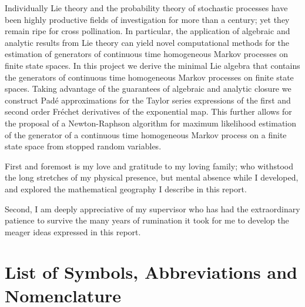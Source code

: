 \documentclass[12pt]{ucalgthes1}
\theoremstyle{definition}\newtheorem{definition}{Definition}
\begin{document}
	\newpage
	Individually Lie theory and the probability theory of stochastic processes have been
	highly productive fields of investigation for more than a century; yet they remain ripe
	for cross pollination. In particular, the application of algebraic and analytic results
	from Lie theory can yield novel computational methods for the estimation of generators of
	continuous time homogeneous Markov processes on finite state spaces. In this project we
	derive the minimal Lie algebra that contains the generators of continuous time homogeneous
	Markov processes on finite state spaces. Taking advantage of the guarantees of algebraic 
	and analytic closure we construct Pad\'{e} approximations for the Taylor series expressions
	of the first and second order Fr\'{e}chet derivatives of the exponential map. This further
	allows for the proposal of a Newton-Raphson algorithm for maximum likelihood estimation of
	the generator of a continuous time homogeneous Markov process on a finite state space from
	stopped random variables.

	\newpage
	First and foremost is my love and gratitude to my loving family; who withstood the long
	stretches of my physical presence, but mental absence while I developed, and explored the
	mathematical geography I describe in this report.
	
	Second, I am deeply appreciative of my supervisor who has had the extraordinary patience 
	to survive the many years of rumination it took for me to develop the meager ideas 
	expressed in this report.

	\begin{singlespace}
		\newpage
		\tableofcontents
		\pagestyle{plain}
		\newpage
		\listoftables
		\pagestyle{plain}
		\newpage
		\listoffigures
		\pagestyle{plain}
		\newpage
		\listofalgorithms
		\pagestyle{plain}
		\clearpage
		\clearpage
	\end{singlespace}
	\newpage
	\chapter*{\bf{List of Symbols, Abbreviations and Nomenclature}\hfill} 
	\listofsymbols
	\pagestyle{plain}
	\clearpage

	
	
	
	
	
	 
	
	\appendix
	
\end{document}
